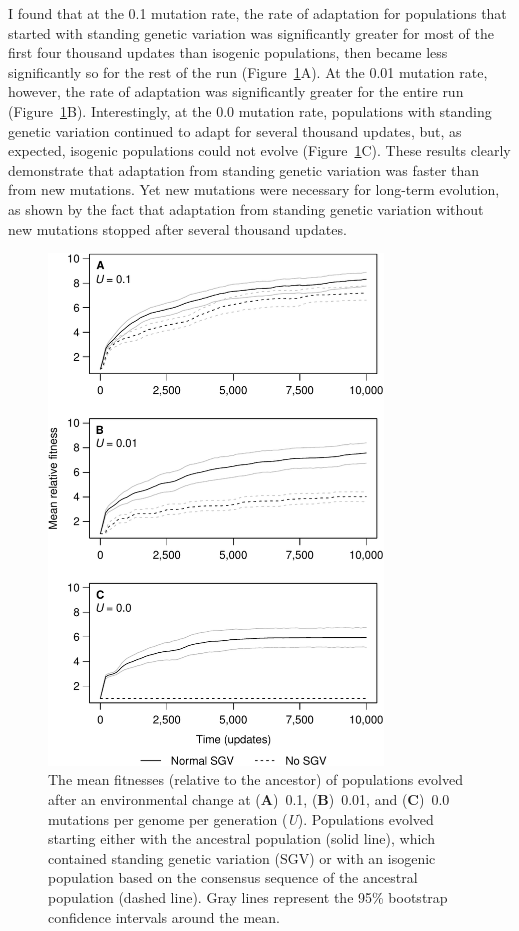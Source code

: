 \begin{doublespace}
I found that at the 0.1 mutation rate,
the rate of adaptation for populations
that started with standing genetic variation
was significantly greater for most of the first four thousand updates
than isogenic populations,
then became less significantly so for the rest of the run
(Figure~\ref{pop-fitness-plot}A).
%
At the 0.01 mutation rate, however,
the rate of adaptation was significantly greater for the entire run
(Figure~\ref{pop-fitness-plot}B).
%
Interestingly, at the 0.0 mutation rate,
populations with standing genetic variation
continued to adapt for several thousand updates,
but, as expected, isogenic populations could not evolve
(Figure~\ref{pop-fitness-plot}C).
%
These results clearly demonstrate that
adaptation from standing genetic variation
was faster than from new mutations.
%
Yet new mutations were necessary for long-term evolution,
as shown by the fact that adaptation
from standing genetic variation without new mutations
stopped after several thousand updates.



\begin{figure}
\begin{center}
\includegraphics[width=3.5in]{pop-fitness-plot.pdf}
\caption{The mean fitnesses (relative to the ancestor)
  of populations evolved after an environmental change
  at (\textbf{A})~0.1, (\textbf{B})~0.01,
  and (\textbf{C})~0.0 mutations per genome per generation (\emph{U}).
  Populations evolved starting either
  with the ancestral population (solid line),
  which contained standing genetic variation (SGV)
  or with an isogenic population based on
  the consensus sequence of the ancestral population (dashed line).
  Gray lines represent the 95\% bootstrap confidence intervals
  around the mean.}
\label{pop-fitness-plot}
\end{center}
\end{figure}




\end{doublespace}

